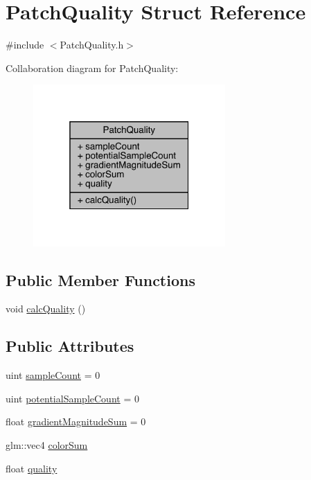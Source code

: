 \hypertarget{struct_patch_quality}{}\section{Patch\+Quality Struct Reference}
\label{struct_patch_quality}


{\ttfamily \#include $<$Patch\+Quality.\+h$>$}



Collaboration diagram for Patch\+Quality\+:\nopagebreak
\begin{figure}[H]
\begin{center}
\leavevmode
\includegraphics[width=208pt]{struct_patch_quality__coll__graph}
\end{center}
\end{figure}
\subsection*{Public Member Functions}
\begin{DoxyCompactItemize}
\item 
void \hyperlink{struct_patch_quality_a330d17106af0e6f3d484c7777201c6f8}{calc\+Quality} ()
\end{DoxyCompactItemize}
\subsection*{Public Attributes}
\begin{DoxyCompactItemize}
\item 
uint \hyperlink{struct_patch_quality_a3c8d512ff345ceef200c3f7c71e7ac38}{sample\+Count} = 0
\item 
uint \hyperlink{struct_patch_quality_adf9ac6ee8def50e84e0e68c4a9078fc2}{potential\+Sample\+Count} = 0
\item 
float \hyperlink{struct_patch_quality_abc1d602a83896430d93d887c14239cbc}{gradient\+Magnitude\+Sum} = 0
\item 
glm\+::vec4 \hyperlink{struct_patch_quality_a96523c3184058de7a735c46baff38a35}{color\+Sum}
\item 
float \hyperlink{struct_patch_quality_abfe27ea5bb26348daaad5445958aff92}{quality}
\end{DoxyCompactItemize}



